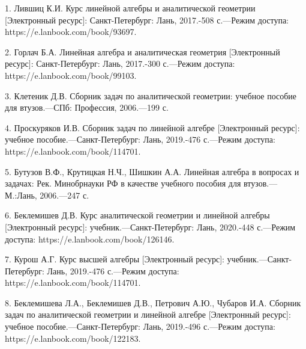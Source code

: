 \documentclass[12pt,a4paper]{article}
\begin{document}
1. Лившиц К.И. Курс линейной алгебры и аналитической геометрии
[Электронный ресурс]: Санкт-Петербург: Лань, 2017.-508 с.---Режим
доступа: https://e.lanbook.com/book/93697.

2. Горлач Б.А. Линейная алгебра и аналитическая геометрия
[Электронный ресурс]: Санкт-Петербург: Лань, 2017.-300 с.---Режим
доступа: https://e.lanbook.com/book/99103.

3. Клетеник Д.В. Сборник задач по аналитической геометрии: учебное
пособие для втузов.---СПб: Профессия, 2006.---199 с.

4. Проскуряков И.В. Сборник задач по линейной алгебре [Электронный
ресурс]: учебное пособие.---Санкт-Петербург: Лань, 2019.-476
с.---Режим доступа: https://e.lanbook.com/book/114701.

5. Бутузов В.Ф., Крутицкая Н.Ч., Шишкин А.А. Линейная алгебра в
вопросах и задачах: Рек. Минобрнауки РФ в качестве учебного пособия
для втузов.---М.:Лань, 2006.---247 с.

6. Беклемишев Д.В. Курс аналитической геометрии и линейной алгебры
[Электронный ресурс]: учебник.---Санкт-Петербург: Лань, 2020.-448
с.---Режим доступа: https://e.lanbook.com/book/126146.

7. Курош А.Г. Курс высшей алгебры [Электронный ресурс]:
учебник.---Санкт-Петербург: Лань, 2019.-476 с.---Режим доступа:
https://e.lanbook.com/book/114701.

8. Беклемишева Л.А., Беклемишев Д.В., Петрович А.Ю., Чубаров И.А.
Сборник задач по аналитической геометрии и линейной алгебре
[Электронный ресурс]: учебное пособие.---Санкт-Петербург: Лань,
2019.-496 с.---Режим доступа: https://e.lanbook.com/book/122183.
\end{document}
